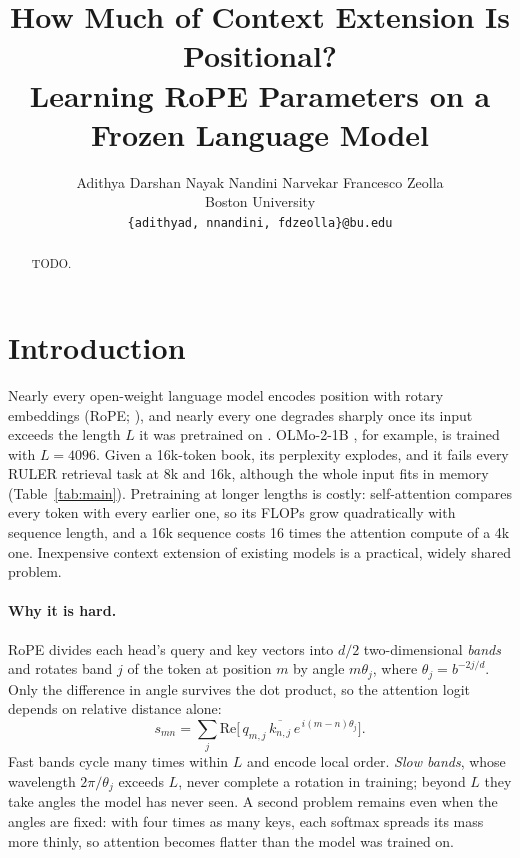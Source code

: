 \documentclass[11pt]{article}
\title{How Much of Context Extension Is Positional?\\Learning RoPE Parameters on a Frozen Language Model}
\author{Adithya Darshan Nayak \quad Nandini Narvekar \quad Francesco Zeolla \\
  Boston University \\
  \texttt{\{adithyad, nnandini, fdzeolla\}@bu.edu}}
\begin{document}
\maketitle

\begin{abstract}
TODO.
\end{abstract}

\section{Introduction}

Nearly every open-weight language model encodes position with rotary embeddings (RoPE; \citealp{su2021roformer}), and nearly every one degrades sharply once its input exceeds the length $L$ it was pretrained on \citep{chen2023pi, peng2024yarn}. OLMo-2-1B \citep{olmo2024olmo2}, for example, is trained with $L = 4096$. Given a 16k-token book, its perplexity explodes, and it fails every RULER retrieval task \citep{hsieh2024ruler} at 8k and 16k, although the whole input fits in memory (Table~\ref{tab:main}). Pretraining at longer lengths is costly: self-attention compares every token with every earlier one, so its FLOPs grow quadratically with sequence length, and a 16k sequence costs 16 times the attention compute of a 4k one. Inexpensive context extension of existing models is a practical, widely shared problem.

\paragraph{Why it is hard.}
RoPE divides each head's query and key vectors into $d/2$ two-dimensional \emph{bands} and rotates band $j$ of the token at position $m$ by angle $m\theta_j$, where $\theta_j = b^{-2j/d}$. Only the difference in angle survives the dot product, so the attention logit depends on relative distance alone:
\begin{equation}
s_{mn} = \textstyle\sum_{j} \mathrm{Re}\big[\,q_{m,j}\,\overline{k_{n,j}}\,e^{\,i(m-n)\theta_j}\big].
\end{equation}
Fast bands cycle many times within $L$ and encode local order. \emph{Slow bands}, whose wavelength $2\pi/\theta_j$ exceeds $L$, never complete a rotation in training; beyond $L$ they take angles the model has never seen. A second problem remains even when the angles are fixed: with four times as many keys, each softmax spreads its mass more thinly, so attention becomes flatter than the model was trained on.
\end{document}

